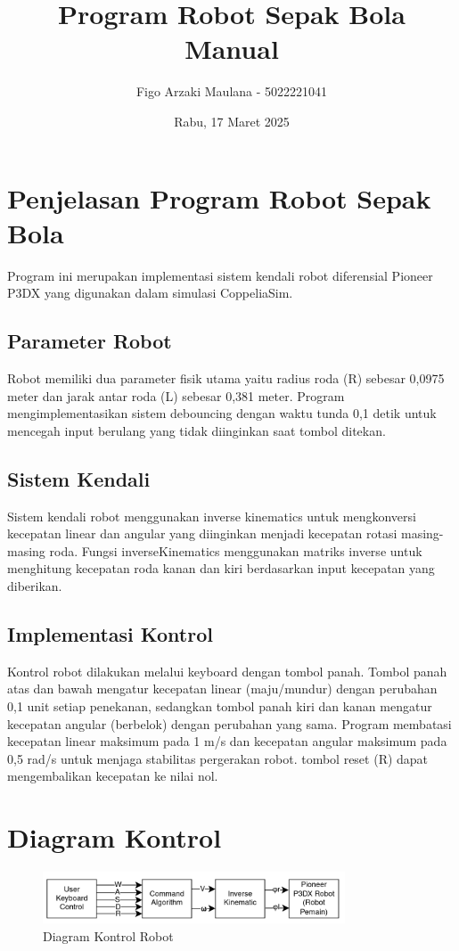 \documentclass{article}
\begin{document}
\title{Program Robot Sepak Bola Manual}
\author{Figo Arzaki Maulana - 5022221041}
\date{Rabu, 17 Maret 2025}
\maketitle
\section{Penjelasan Program Robot Sepak Bola}

Program ini merupakan implementasi sistem kendali robot diferensial Pioneer P3DX yang digunakan dalam simulasi CoppeliaSim.

\subsection{Parameter Robot}
Robot memiliki dua parameter fisik utama yaitu radius roda (R) sebesar 0,0975 meter dan jarak antar roda (L) sebesar 0,381 meter. Program mengimplementasikan sistem debouncing dengan waktu tunda 0,1 detik untuk mencegah input berulang yang tidak diinginkan saat tombol ditekan.

\subsection{Sistem Kendali}
Sistem kendali robot menggunakan inverse kinematics untuk mengkonversi kecepatan linear dan angular yang diinginkan menjadi kecepatan rotasi masing-masing roda. Fungsi inverseKinematics menggunakan matriks inverse untuk menghitung kecepatan roda kanan dan kiri berdasarkan input kecepatan yang diberikan.

\subsection{Implementasi Kontrol}
Kontrol robot dilakukan melalui keyboard dengan tombol panah. Tombol panah atas dan bawah mengatur kecepatan linear (maju/mundur) dengan perubahan 0,1 unit setiap penekanan, sedangkan tombol panah kiri dan kanan mengatur kecepatan angular (berbelok) dengan perubahan yang sama. Program membatasi kecepatan linear maksimum pada 1 m/s dan kecepatan angular maksimum pada 0,5 rad/s untuk menjaga stabilitas pergerakan robot. tombol reset (R) dapat mengembalikan kecepatan ke nilai nol.

\section{Diagram Kontrol}
\begin{figure}[h]
    \centering
    \includegraphics[width=0.8\textwidth]{control.png}
    \caption{Diagram Kontrol Robot}
    \label{fig:control}
\end{figure}
\newpage
\end{document}
